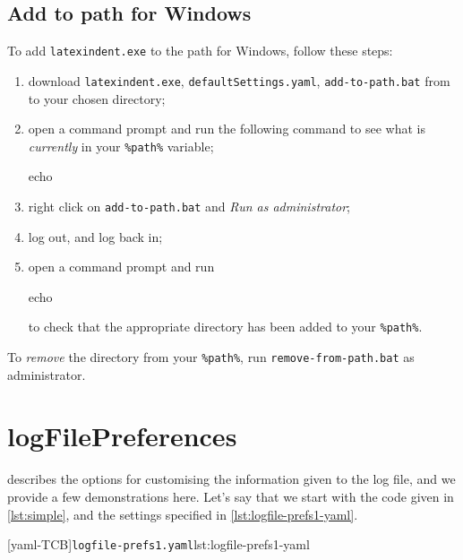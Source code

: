 	\subsection{Add to path for Windows}
		To add \texttt{latexindent.exe} to the path for Windows, follow these steps:
		\begin{enumerate}
			\item download  \texttt{latexindent.exe}, \texttt{defaultSettings.yaml},  \texttt{add-to-path.bat} from
			      \cite{latexindent-home} to your chosen directory;
			\item open a command prompt and run the following command to see what is \emph{currently}
			      in your \lstinline!%path%! variable;
			      \begin{dosprompt}
echo %
          \end{dosprompt}
			\item right click on \texttt{add-to-path.bat} and \emph{Run as administrator};
			\item log out, and log back in;
			\item open a command prompt and run
			      \begin{dosprompt}
echo %
          \end{dosprompt}
			      to check that the appropriate directory has been added to your \lstinline!%path%!.
		\end{enumerate}
		To \emph{remove} the directory from your \lstinline!%path%!, run
		\texttt{remove-from-path.bat} as administrator.

	\section{logFilePreferences}\label{app:logfile-demo}
	  describes the options for customising the information given
	 to the log file, and we provide a few demonstrations here. Let's say that we start with
	 the code given in \cref{lst:simple}, and the settings specified in
	 \cref{lst:logfile-prefs1-yaml}.

	 \begin{minipage}{.35\linewidth}
	 \end{minipage}
	 \hfill
	 \begin{minipage}{.6\linewidth}
		 [yaml-TCB]{\texttt{logfile-prefs1.yaml}}{lst:logfile-prefs1-yaml}
	 \end{minipage}

